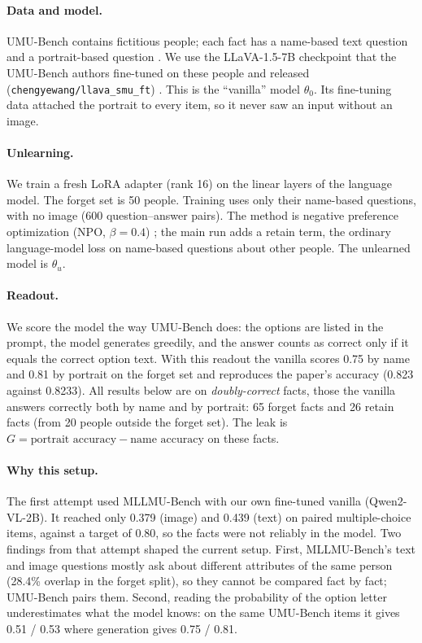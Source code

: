 \documentclass[11pt]{article}
\newcommand{\thu}{\theta_u}
\newcommand{\tho}{\theta_0}
\begin{document}
\paragraph{Data and model.} UMU-Bench contains fictitious people; each fact has a
name-based text question and a portrait-based question \cite{umubench}. We use the
LLaVA-1.5-7B checkpoint that the UMU-Bench authors fine-tuned on these people and released
(\texttt{chengyewang/llava\_smu\_ft}) \cite{llava15}. This is the ``vanilla'' model
$\tho$. Its fine-tuning data attached the portrait to every item, so it never saw an input
without an image.

\paragraph{Unlearning.} We train a fresh LoRA adapter (rank 16) on the linear layers of
the language model. The forget set is 50 people. Training uses only their name-based
questions, with no image (600 question--answer pairs). The method is negative preference
optimization (NPO, $\beta=0.4$) \cite{npo}; the main run adds a retain term, the ordinary
language-model loss on name-based questions about other people. The unlearned model is
$\thu$.

\paragraph{Readout.} We score the model the way UMU-Bench does: the options are listed in
the prompt, the model generates greedily, and the answer counts as correct only if it
equals the correct option text. With this readout the vanilla scores 0.75 by name and 0.81
by portrait on the forget set and reproduces the paper's accuracy (0.823 against 0.8233).
All results below are on \emph{doubly-correct} facts, those the vanilla answers correctly
both by name and by portrait: 65 forget facts and 26 retain facts (from 20 people outside
the forget set). The leak is $G=\text{portrait accuracy}-\text{name accuracy}$ on these
facts.

\paragraph{Why this setup.} The first attempt used MLLMU-Bench \cite{mllmu} with our own
fine-tuned vanilla (Qwen2-VL-2B). It reached only 0.379 (image) and 0.439 (text) on paired
multiple-choice items, against a target of 0.80, so the facts were not reliably in the
model. Two findings from that attempt shaped the current setup. First, MLLMU-Bench's text
and image questions mostly ask about different attributes of the same person (28.4\%
overlap in the forget split), so they cannot be compared fact by fact; UMU-Bench pairs
them. Second, reading the probability of the option letter underestimates what the model
knows: on the same UMU-Bench items it gives 0.51 / 0.53 where generation gives
0.75 / 0.81.
\end{document}

